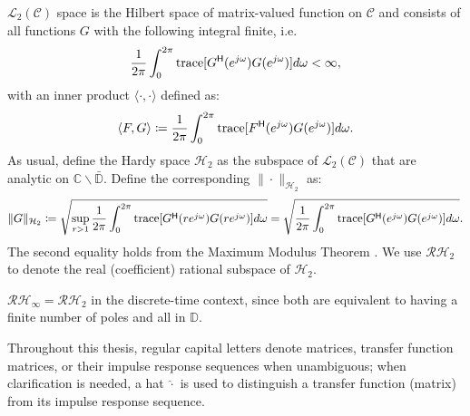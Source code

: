 \begin{defn}
\(\mathcal{L}_2(\mathcal{C})\) space is the Hilbert space of matrix-valued function on \(\mathcal{C}\) and consists of all functions \(G\) with the following integral finite, i.e.
\begin{equation*}
    \frac{1}{2\pi}\int_0^{2\pi}\mathrm{trace}[G^{\mathsf{H}} (e^{j\omega}) G(e^{j\omega})]d\omega < \infty, 
\end{equation*}
with an inner product \(\langle \cdot, \cdot \rangle\) defined as:
\begin{equation*}
    \langle F, G \rangle \coloneqq \frac{1}{2\pi}\int_0^{2\pi}\mathrm{trace}[F^{\mathsf{H}} (e^{j\omega}) G(e^{j\omega})]d\omega.
\end{equation*}
As usual, define the Hardy space \(\mathcal{H}_2\) as the subspace of \(\mathcal{L}_2(\mathcal{C})\) that are analytic on \(\mathbb{C} \backslash \bar{\mathbb{D}}\). Define the corresponding \(\|\cdot\|_{\mathcal{H}_2}\) as:
\begin{equation}\label{eqn::H2defn}
    \|G\|_{\mathcal{H}_2} \coloneqq \sqrt{\sup_{r>1}\frac{1}{2\pi}\int_0^{2\pi}\mathrm{trace}[G^{\mathsf{H}}(r e^{j\omega})G(r e^{j\omega})]d\omega}
    = \sqrt{\frac{1}{2\pi}\int_0^{2\pi}\mathrm{trace}[G^{\mathsf{H}}(e^{j\omega})G(e^{j\omega})]d\omega}.
\end{equation}
The second equality holds from the Maximum Modulus Theorem \cite{Zhou1996RobustControl}. We use \(\mathcal{RH}_2\) to denote the real (coefficient) rational subspace of \(\mathcal{H}_2\).
\end{defn}
\begin{rem}
\(\mathcal{RH}_\infty = \mathcal{RH}_2\) in the discrete-time context, since both are equivalent to having a finite number of poles and all in \(\mathbb{D}\).     
\end{rem}

Throughout this thesis, regular capital letters denote matrices, transfer function matrices, or their impulse response sequences when unambiguous; when clarification is needed, a hat \(\hat{\cdot}\) is used to distinguish a transfer function (matrix) from its impulse response sequence.

